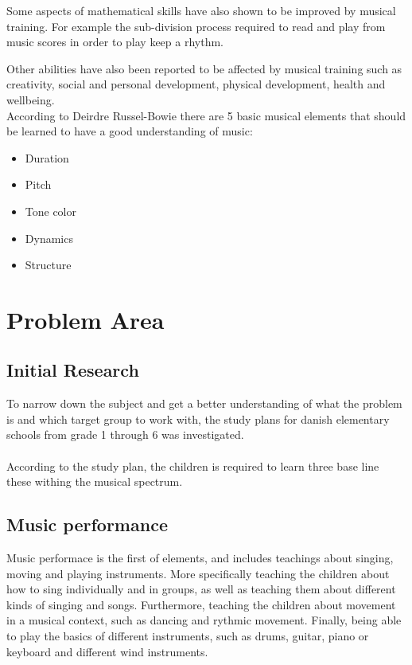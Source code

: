 Some aspects of mathematical skills have also shown to be improved by musical training. For example the sub-division process required to read and play from music scores in order to play keep a rhythm\cite{powerOfMusic}.

Other abilities have also been reported to be affected by musical training such as creativity, social and personal development, physical development, health and wellbeing\cite{powerOfMusic}.\\

According to Deirdre Russel-Bowie there are 5 basic musical elements that should be learned to have a good understanding of music\cite{primaryArts}:
\begin{itemize}
	\item Duration
	\item Pitch
	\item Tone color
	\item Dynamics
	\item Structure
\end{itemize}

\section{Problem Area}

	\subsection{Initial Research}
	To narrow down the subject and get a better understanding of what the problem is and which target group to work with, the study plans for danish elementary schools from grade 1 through 6 was investigated.\\
	\\
	According to the study plan, the children is required to learn three base line these withing the musical spectrum. 
	\subsection*{Music performance}
	Music performace is the first of elements, and includes teachings about singing, moving and playing instruments. More specifically teaching the children about how to sing individually and in groups, as well as teaching them about different kinds of singing and songs. Furthermore, teaching the children about movement in a musical context, such as dancing and rythmic movement. Finally, being able to play the basics of different instruments, such as drums, guitar, piano or keyboard and different wind instruments.
	
